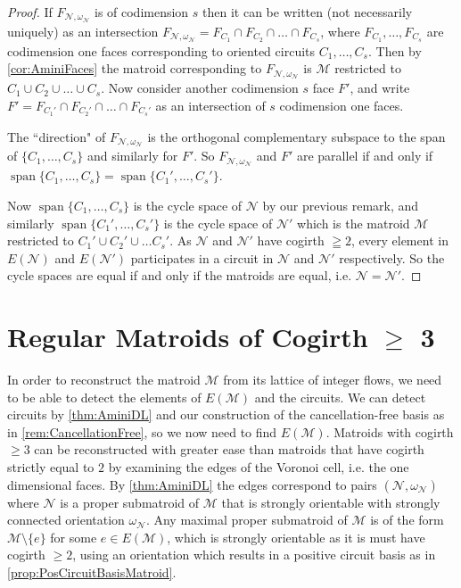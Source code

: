 \documentclass[12pt]{report}
\theoremstyle{definition}
\DeclareMathOperator{\spn}{span}
\def\calM{\mathcal M}
\def\calN{\mathcal N}
\theoremstyle{upright}
\begin{document}
\begin{proof}

    If $F_{\calN, \omega_\calN}$ is of codimension $s$ then it can be written (not necessarily uniquely) as an intersection $F_{\calN, \omega_\calN}=F_{C_1}\cap F_{C_2}\cap\dots\cap F_{C_s}$, where $F_{C_1}, \dots, F_{C_s}$ are codimension one faces corresponding to oriented circuits $C_1, \dots, C_s$.
    Then by \cref{cor:AminiFaces} the matroid corresponding to $F_{\calN, \omega_\calN}$ is $\calM$ restricted to $C_1\cup C_2\cup\dots\cup C_s$.
    Now consider another codimension $s$ face $F'$, and write $F'=F_{C_1'}\cap F_{C_2'}\cap\dots\cap F_{C_s'}$ as an intersection of $s$ codimension one faces.

    The ``direction" of $F_{\calN, \omega_\calN}$ is the orthogonal complementary subspace to the span of $\{C_1, \dots, C_s\}$ and similarly for $F'$.
    So $F_{\calN, \omega_\calN}$ and $F'$ are parallel if and only if $\spn\{C_1, \dots, C_s\}=\spn\{C_1', \dots, C_s'\}$.

    Now $\spn\{C_1, \dots, C_s\}$ is the cycle space of $\calN$ by our previous remark, and similarly $\spn\{C_1', \dots, C_s'\}$ is the cycle space of $\calN'$ which is the matroid $\calM$ restricted to $C_1'\cup C_2'\cup\dots C_s'$.
    As $\calN$ and $\calN'$ have cogirth $\geqq2$, every element in $E(\calN)$ and  $E(\calN')$ participates in a circuit in $\calN$ and $\calN'$ respectively.
    So the cycle spaces are equal if and only if the matroids are equal, i.e. $\calN=\calN'$.
    
\end{proof}

\section{Regular Matroids of Cogirth $\geq$ 3}
\label{sec:Cogirth3}

In order to reconstruct the matroid $\calM$ from its lattice of integer flows, we need to be able to detect the elements of $E(\calM)$ and the circuits.
We can detect circuits by \cref{thm:AminiDL} and our construction of the cancellation-free basis as in \cref{rem:CancellationFree}, so we now need to find $E(\calM)$.
Matroids with cogirth $\geq3$ can be reconstructed with greater ease than matroids that have cogirth strictly equal to $2$ by examining the edges of the Voronoi cell, i.e. the one dimensional faces.
By \cref{thm:AminiDL} the edges correspond to pairs $(\calN, \omega_\calN)$ where $\calN$ is a proper submatroid of $\calM$ that is strongly orientable with strongly connected orientation $\omega_\calN$.
Any maximal proper submatroid of $\calM$ is of the form $\calM\setminus\{e\}$ for some $e\in E(\calM)$, which is strongly orientable as it is must have cogirth $\geq2$, using an orientation which results in a positive circuit basis as in \cref{prop:PosCircuitBasisMatroid}.
\end{document}
